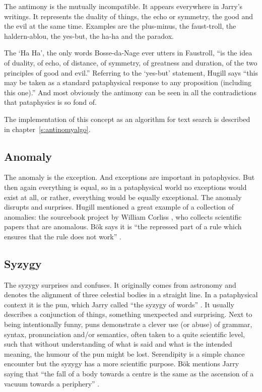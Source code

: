 The antimony is the mutually incompatible. It appears everywhere in Jarry's writings. It represents the duality of things, the echo or symmetry, the good and the evil at the same time. Examples are the plus-minus, the faust-troll, the haldern-ablou, the yes-but, the ha-ha and the paradox.

The `Ha Ha', the only words Bosse-da-Nage ever utters in Faustroll, ``is the idea of duality, of echo, of distance, of symmetry, of greatness and duration, of the two principles of good and evil.'' \autocite{Hugill2012} Referring to the `yes-but' statement, Hugill says ``this may be taken as a standard pataphysical response to any proposition (including this one).'' And most obviously the antimony can be seen in all the contradictions that pataphysics is so fond of.

The implementation of this concept as an algorithm for text search is described in chapter~\ref{s:antinomyalgo}.


\subsection{Anomaly}
\label{s:anomaly}

The anomaly is the exception. And exceptions are important in pataphysics. But then again everything is equal, so in a pataphysical world no exceptions would exist at all, or rather, everything would be equally exceptional. The anomaly disrupts and surprises. Hugill mentioned a great example of a collection of anomalies: the sourcebook project by William Corliss \autocite*{Corlissnd}, who collects scientific papers that are anomalous. Bök says it is ``the repressed part of a rule which ensures that the rule does not work'' \autocite*{Bok2002}.


\subsection{Syzygy}
\label{s:syzygy}

The syzygy surprises and confuses. It originally comes from astronomy and denotes the alignment of three celestial bodies in a straight line. In a pataphysical context it is the pun, which Jarry called ``the syzygy of words'' \autocite*{Jarry1996}. It usually describes a conjunction of things, something unexpected and surprising. Next to being intentionally funny, puns demonstrate a clever use (or abuse) of grammar, syntax, pronunciation and/or semantics, often taken to a quite scientific level, such that without understanding of what is said and what is the intended meaning, the humour of the pun might be lost. Serendipity is a simple chance encounter but the syzygy has a more scientific purpose. Bök mentions Jarry saying that ``the fall of a body towards a centre is the same as the ascension of a vacuum towards a periphery'' \autocite*{Bok2002}.

